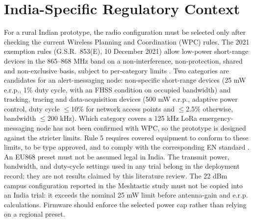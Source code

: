 \documentclass[journal]{IEEEtran}
\begin{document}
\section{India-Specific Regulatory Context}
For a rural Indian prototype, the radio configuration must be selected only
after checking the current Wireless Planning and Coordination (WPC) rules.
The 2021 exemption rules (G.S.R.~853(E), 10 December 2021) allow low-power
short-range devices in the 865--868 MHz band on a non-interference,
non-protection, shared and non-exclusive basis, subject to per-category limits
\cite{india2021}. Two categories are candidates for an alert-messaging node:
non-specific short-range devices (25 mW e.r.p., 1\% duty cycle, with an FHSS
condition on occupied bandwidth) and tracking, tracing and data-acquisition
devices (500 mW e.r.p., adaptive power control, duty cycle $\leq$10\% for
network access points and $\leq$2.5\% otherwise, bandwidth $\leq$200 kHz).
Which category covers a 125 kHz LoRa emergency-messaging node has not been
confirmed with WPC, so the prototype is designed against the stricter limits.
Rule 5 requires covered equipment to conform to these limits, to be type
approved, and to comply with the corresponding EN standard \cite{india2021}.
An EU868 preset must not be assumed legal in India. The transmit power,
bandwidth, and duty-cycle settings used in any trial belong in the deployment
record; they are not results claimed by this literature review.
The 22 dBm campus configuration reported in the Meshtastic study must not be
copied into an India trial: it exceeds the nominal 25 mW limit before
antenna-gain and e.r.p. calculations. Firmware should enforce the selected
power cap rather than relying on a regional preset.
\end{document}
